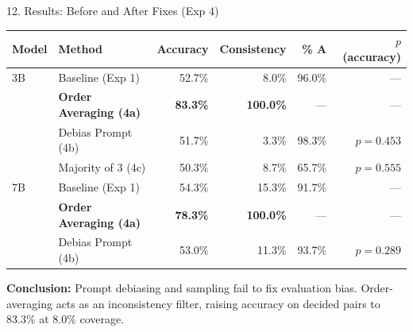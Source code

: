 \documentclass[aspectratio=169]{beamer}
\begin{document}
\begin{frame}{12. Results: Before and After Fixes (Exp 4)}
  \begin{table}
    \centering
    \footnotesize
    \begin{tabular}{llrrrr}
      \toprule
      Model & Method & Accuracy & Consistency & \% A & $p$ (accuracy) \\
      \midrule
      3B & Baseline (Exp 1) & 52.7\% & 8.0\% & 96.0\% & --- \\
         & \textbf{Order Averaging (4a)} & \textbf{83.3\%} & \textbf{100.0\%} & --- & --- \\
         & Debias Prompt (4b) & 51.7\% & 3.3\% & 98.3\% & $p=0.453$ \\
         & Majority of 3 (4c) & 50.3\% & 8.7\% & 65.7\% & $p=0.555$ \\
      \midrule
      7B & Baseline (Exp 1) & 54.3\% & 15.3\% & 91.7\% & --- \\
         & \textbf{Order Averaging (4a)} & \textbf{78.3\%} & \textbf{100.0\%} & --- & --- \\
         & Debias Prompt (4b) & 53.0\% & 11.3\% & 93.7\% & $p=0.289$ \\
      \bottomrule
    \end{tabular}
  \end{table}
  \textbf{Conclusion:} Prompt debiasing and sampling fail to fix evaluation bias. Order-averaging acts as an inconsistency filter, raising accuracy on decided pairs to 83.3\% at 8.0\% coverage.
\end{frame}
\end{document}
